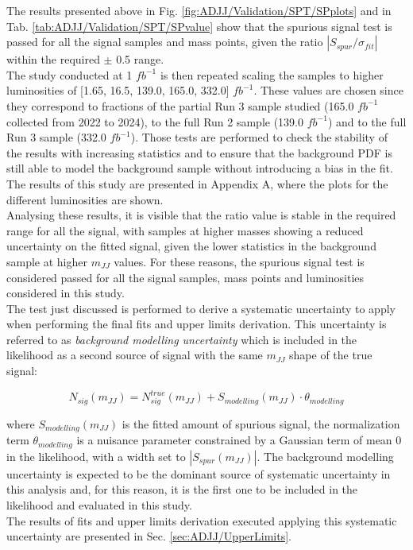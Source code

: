 \noindent The results presented above in Fig. \ref{fig:ADJJ/Validation/SPT/SPplots} and in Tab. \ref{tab:ADJJ/Validation/SPT/SPvalue} show that the spurious signal test is passed for all the signal samples and mass points, given the ratio $|S_{spur}/\sigma_{fit}|$ within the required $\pm$ 0.5 range.\\
The study conducted at 1 $fb^{-1}$ is then repeated scaling the samples to higher luminosities of [1.65, 16.5, 139.0, 165.0, 332.0]  $fb^{-1}$.
These values are chosen since they correspond to fractions of the partial Run 3 sample studied (165.0 $fb^{-1}$ collected from 2022 to 2024), to the full Run 2 sample (139.0 $fb^{-1}$) and to the full Run 3 sample (332.0 $fb^{-1}$). 
Those tests are performed to check the stability of the results with increasing statistics and to ensure that the background PDF is still able to model the background sample without introducing a bias in the fit.\\
The results of this study are presented in Appendix A, where the plots for the different luminosities are shown.\\
Analysing these results, it is visible that the ratio value is stable in the required range for all the signal, with samples at higher masses showing a reduced uncertainty on the fitted signal, given the lower statistics in the background sample at higher $m_{JJ}$ values.
For these reasons, the spurious signal test is considered passed for all the signal samples, mass points and luminosities considered in this study.\\
The test just discussed is performed to derive a systematic uncertainty to apply when performing the final fits and upper limits derivation.
This uncertainty is referred to as \textit{background modelling uncertainty} which is included in the likelihood as a second source of signal with the same $m_{JJ}$ shape of the true signal:

\begin{equation}\label{ADJJ/Validation/SPT/Modified_likelihood}
  N_{sig}(m_{JJ}) = N_{sig}^{true}(m_{JJ}) + S_{modelling}(m_{JJ})\cdot \theta_{modelling}
\end{equation}

\noindent where $S_{modelling}(m_{JJ})$ is the fitted amount of spurious signal, the normalization term $\theta_{modelling}$ is a nuisance parameter constrained by a Gaussian term of mean 0 in the likelihood, with a width set to $|S_{spur}(m_{JJ})|$.
The background modelling uncertainty is expected to be the dominant source of systematic uncertainty in this analysis and, for this reason, it is the first one to be included in the likelihood and evaluated in this study.\\
The results of fits and upper limits derivation executed applying this systematic uncertainty are presented in Sec. \ref{sec:ADJJ/UpperLimits}.

